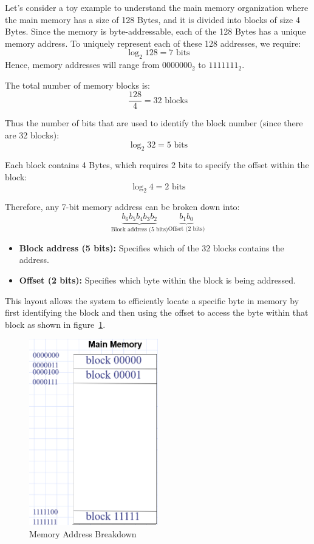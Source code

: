 \documentclass[12pt]{book}
\begin{document}
\begin{example}
    Let's consider a toy example to understand the main memory organization where the main memory has a size of 128 Bytes, and it is divided into blocks of size 4 Bytes. Since the memory is byte-addressable, each of the 128 Bytes has a unique memory address. To uniquely represent each of these 128 addresses, we require:
    \[
    \log_2 128 = 7 \text{ bits}
    \]
    Hence, memory addresses will range from $0000000_2$ to $1111111_2$. 

    The total number of memory blocks is:
    \[
    \frac{128}{4} = 32 \text{ blocks}
    \]
    
    Thus the number of bits that are used to identify the block number (since there are 32 blocks):
    \[
    \log_2 32 = 5 \text{ bits}
    \]

    Each block contains 4 Bytes, which requires 2 bits to specify the offset within the block:
    \[
    \log_2 4 = 2 \text{ bits}
    \]
    
    Therefore, any 7-bit memory address can be broken down into:
    \[
    \underbrace{b_6b_5b_4b_3b_2}_{\text{Block address (5 bits)}} \underbrace{b_1b_0}_{\text{Offset (2 bits)}}
    \]
    \begin{itemize}
        \item \textbf{Block address (5 bits):} Specifies which of the 32 blocks contains the address.
        \item \textbf{Offset (2 bits):} Specifies which byte within the block is being addressed.
    \end{itemize}

    This layout allows the system to efficiently locate a specific byte in memory by first identifying the block and then using the offset to access the byte within that block as shown in figure~\ref{fig:memory_addressing}.
    \begin{figure}[H]
        \centering
        \includegraphics[width=0.5\textwidth]{images/memory_addressing.png}
        \caption{Memory Address Breakdown}
        \label{fig:memory_addressing}
    \end{figure}
\end{example}
\end{document}
